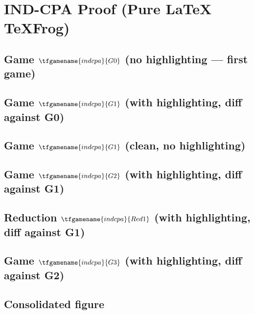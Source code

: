 \documentclass{article}
\begin{document}
\section*{IND-CPA Proof (Pure \LaTeX{} TeXFrog)}

\subsection*{Game $\tfgamename{indcpa}{G0}$ (no highlighting --- first game)}

\subsection*{Game $\tfgamename{indcpa}{G1}$ (with highlighting, diff against G0)}

\subsection*{Game $\tfgamename{indcpa}{G1}$ (clean, no highlighting)}

\subsection*{Game $\tfgamename{indcpa}{G2}$ (with highlighting, diff against G1)}

\subsection*{Reduction $\tfgamename{indcpa}{Red1}$ (with highlighting, diff against G1)}

\subsection*{Game $\tfgamename{indcpa}{G3}$ (with highlighting, diff against G2)}

\subsection*{Consolidated figure}
\end{document}

